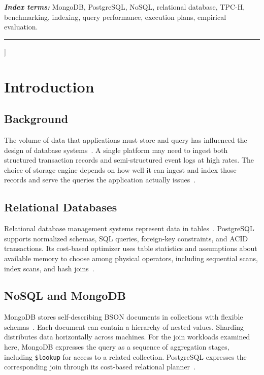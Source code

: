 \documentclass[10pt,a4paper,twocolumn]{article}
\begin{document}
\vspace{6pt}
\noindent\textbf{\textit{Index terms:}} MongoDB, PostgreSQL, NoSQL, relational database,
TPC-H, benchmarking, indexing, query performance, execution plans, empirical evaluation.

\vspace{4pt}
\noindent\rule{\textwidth}{0.5pt}
\vspace{10pt}
]%

\thispagestyle{plain}

\section{Introduction}

\subsection{Background}
The volume of data that applications must store and query has influenced the design of database systems~\cite{stonebraker2005c}. A single platform may need to ingest both structured transaction records and semi-structured event logs at high rates. The choice of storage engine depends on how well it can ingest and index those records and serve the queries the application actually issues~\cite{pavlo2016relational}.

\subsection{Relational Databases}
Relational database management systems represent data in tables~\cite{codd1970relational}. PostgreSQL supports normalized schemas, SQL queries, foreign-key constraints, and ACID transactions. Its cost-based optimizer uses table statistics and assumptions about available memory to choose among physical operators, including sequential scans, index scans, and hash joins~\cite{postgresql_docs,postgresql_explain}.

\subsection{NoSQL and MongoDB}
MongoDB stores self-describing BSON documents in collections with flexible schemas~\cite{mongodb_docs}. Each document can contain a hierarchy of nested values. Sharding distributes data horizontally across machines. For the join workloads examined here, MongoDB expresses the query as a sequence of aggregation stages, including \texttt{\$lookup} for access to a related collection. PostgreSQL expresses the corresponding join through its cost-based relational planner~\cite{mongodb_aggregation,mongodb_explain}.
\end{document}
